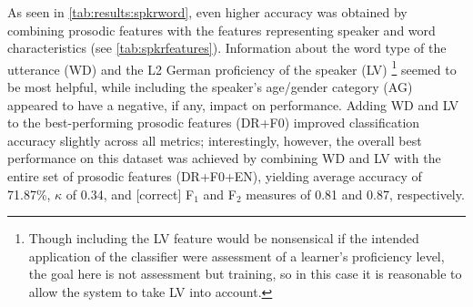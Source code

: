 \documentclass[a4paper]{article}
\begin{document}
		As seen in \cref{tab:results:spkrword}, even higher accuracy was obtained by combining prosodic features with the features representing speaker and word characteristics (see \cref{tab:spkrfeatures}). Information about the word type of the utterance (WD) and the L2 German proficiency of the speaker (LV)%
		\footnote{Though including the LV feature would be nonsensical if the intended application of the classifier were assessment of a learner's proficiency level, the goal here is not assessment but training, 
		so in this case it is reasonable to allow the system to take LV into account. }		
		 seemed to be most helpful, while including the speaker's age/gender category (AG) appeared to have a negative, if any, impact on performance. 
		Adding WD and LV to the best-performing prosodic features (DR+F0) improved classification accuracy slightly across all metrics; interestingly, however, the overall best performance on this dataset was achieved by combining WD and LV with the entire set of prosodic features (DR+F0+EN), yielding average accuracy of 71.87\%, $\kappa$ of 0.34, and [correct] F$_1$ and F$_2$ measures of 0.81 and 0.87, respectively.
		
\end{document}

